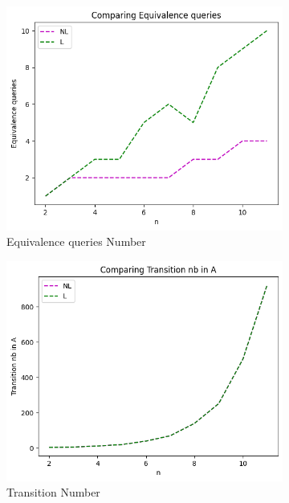 \begin{figure}[!htb]
  \begin{subfigure}[b]{0.25\textwidth}
    \includegraphics[width=\textwidth]{../statistics/plots/wrostRFSA/Equivalence queries.png}
    \caption{Equivalence queries Number}
    \label{fig:EquivWrostRFSACompare}
  \end{subfigure}
  \begin{subfigure}[b]{0.25\textwidth}
    \includegraphics[width=\textwidth]{../statistics/plots/wrostRFSA/Transition nb in A.png}
    \caption{Transition Number}
    \label{fig:TransitionWrostRFSACompare}
  \end{subfigure}
  \begin{subfigure}[b]{0.25\textwidth}

\end{subfigure}
\end{figure}
